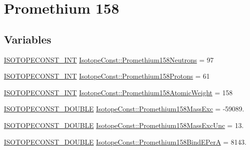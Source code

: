 \hypertarget{group___isotope_const-_promethium-_pm158}{}\section{Promethium 158}
\label{group___isotope_const-_promethium-_pm158}
\subsection*{Variables}
\begin{DoxyCompactItemize}
\item 
\mbox{\hyperlink{group___isotope_const-_macros_ga5f18360b3e99483a35c32d789e62621c}{I\+S\+O\+T\+O\+P\+E\+C\+O\+N\+S\+T\+\_\+\+I\+NT}} \mbox{\hyperlink{group___isotope_const-_promethium-_pm158_ga931e5feb5cf33cdf4332525a32d4c6a1}{Isotope\+Const\+::\+Promethium158\+Neutrons}} = 97
\item 
\mbox{\hyperlink{group___isotope_const-_macros_ga5f18360b3e99483a35c32d789e62621c}{I\+S\+O\+T\+O\+P\+E\+C\+O\+N\+S\+T\+\_\+\+I\+NT}} \mbox{\hyperlink{group___isotope_const-_promethium-_pm158_ga00cada2503207cdaaefb0d55fa934b2f}{Isotope\+Const\+::\+Promethium158\+Protons}} = 61
\item 
\mbox{\hyperlink{group___isotope_const-_macros_ga5f18360b3e99483a35c32d789e62621c}{I\+S\+O\+T\+O\+P\+E\+C\+O\+N\+S\+T\+\_\+\+I\+NT}} \mbox{\hyperlink{group___isotope_const-_promethium-_pm158_gac27578f7c7a583481033b16723170860}{Isotope\+Const\+::\+Promethium158\+Atomic\+Weight}} = 158
\item 
\mbox{\hyperlink{group___isotope_const-_macros_ga8f45a7272ce02c0b4c65c44636ed719a}{I\+S\+O\+T\+O\+P\+E\+C\+O\+N\+S\+T\+\_\+\+D\+O\+U\+B\+LE}} \mbox{\hyperlink{group___isotope_const-_promethium-_pm158_ga1d433ee1ecb8349ed4e1ebda50ad63ef}{Isotope\+Const\+::\+Promethium158\+Mass\+Exc}} = -\/59089.
\item 
\mbox{\hyperlink{group___isotope_const-_macros_ga8f45a7272ce02c0b4c65c44636ed719a}{I\+S\+O\+T\+O\+P\+E\+C\+O\+N\+S\+T\+\_\+\+D\+O\+U\+B\+LE}} \mbox{\hyperlink{group___isotope_const-_promethium-_pm158_ga8519026b156660c2b707bbb276c6202c}{Isotope\+Const\+::\+Promethium158\+Mass\+Exc\+Unc}} = 13.
\item 
\mbox{\hyperlink{group___isotope_const-_macros_ga8f45a7272ce02c0b4c65c44636ed719a}{I\+S\+O\+T\+O\+P\+E\+C\+O\+N\+S\+T\+\_\+\+D\+O\+U\+B\+LE}} \mbox{\hyperlink{group___isotope_const-_promethium-_pm158_ga9485d885d9d8c2453610e14aa7577dc8}{Isotope\+Const\+::\+Promethium158\+Bind\+E\+PerA}} = 8143.

\end{DoxyCompactItemize}
